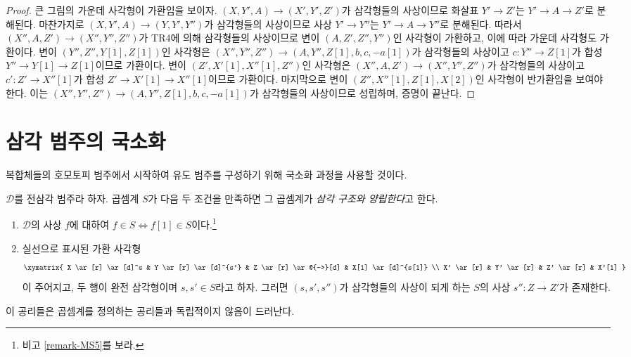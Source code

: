 \begin{proof}
\medskip\noindent
큰 그림의 가운데 사각형이 가환임을 보이자.
$(X, Y', A) \to (X', Y', Z')$가 삼각형들의 사상이므로 화살표
$Y' \to Z'$는 $Y' \to A \to Z'$로 분해된다. 마찬가지로
$(X, Y', A) \to (Y, Y', Y'')$가 삼각형들의 사상이므로 사상
$Y' \to Y''$는 $Y' \to A \to Y''$로 분해된다. 따라서
$(X'', A, Z') \to (X'', Y'', Z'')$가 TR4에 의해 삼각형들의
사상이므로 변이 $(A, Z', Z'', Y'')$인 사각형이 가환하고, 이에 따라
가운데 사각형도 가환이다. 변이 $(Y'', Z'', Y[1], Z[1])$인 사각형은
$(X'', Y'', Z'') \to (A, Y'', Z[1], b, c , -a[1])$가 삼각형들의
사상이고 $c : Y'' \to Z[1]$가 합성 $Y'' \to Y[1] \to Z[1]$이므로
가환이다. 변이 $(Z', X'[1], X''[1], Z'')$인 사각형은
$(X'', A, Z') \to (X'', Y'', Z'')$가 삼각형들의 사상이고
$c' : Z' \to X''[1]$가 합성 $Z' \to X'[1] \to X''[1]$이므로 가환이다.
마지막으로 변이 $(Z'', X''[1], Z[1], X[2])$인 사각형이 반가환임을
보여야 한다. 이는
$(X'', Y'', Z'') \to (A, Y'', Z[1], b, c , -a[1])$가 삼각형들의
사상이므로 성립하며, 증명이 끝난다.
\end{proof}

\section{삼각 범주의 국소화}
\label{section-localization}

\noindent
복합체들의 호모토피 범주에서 시작하여 유도 범주를 구성하기 위해
국소화 과정을 사용할 것이다.

\begin{definition}
\label{definition-localization}
$\mathcal{D}$를 전삼각 범주라 하자. 곱셈계 $S$가 다음 두 조건을
만족하면 그 곱셈계가 {\it 삼각 구조와 양립한다}고 한다.
\begin{enumerate}
\item[MS5] $\mathcal{D}$의 사상 $f$에 대하여
$f \in S \Leftrightarrow f[1] \in S$이다.\footnote{비고
\ref{remark-MS5}를 보라.}
\item[MS6] 실선으로 표시된 가환 사각형
$$
\xymatrix{
X \ar[r] \ar[d]^s &
Y \ar[r] \ar[d]^{s'} &
Z \ar[r] \ar@{-->}[d] &
X[1] \ar[d]^{s[1]} \\
X' \ar[r] &
Y' \ar[r] &
Z' \ar[r] &
X'[1]
}
$$
이 주어지고, 두 행이 완전 삼각형이며 $s, s' \in S$라고 하자.
그러면 $(s, s', s'')$가 삼각형들의 사상이 되게 하는
$S$의 사상 $s'' : Z \to Z'$가 존재한다.
\end{enumerate}
\end{definition}

\noindent
이 공리들은 곱셈계를 정의하는 공리들과 독립적이지 않음이 드러난다.

